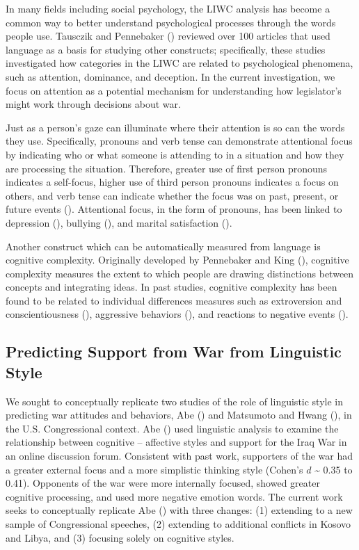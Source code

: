 \documentclass[jou,a4paper]{apa6}
\begin{document}
In many fields including social psychology, the LIWC analysis has become a common way to better understand psychological processes through the words people use. Tausczik and Pennebaker (\citeyear{Tausczik2012}) reviewed over 100 articles that used language as a basis for studying other constructs; specifically, these studies investigated how categories in the LIWC are related to psychological phenomena, such as attention, dominance, and deception. In the current investigation, we focus on attention as a potential mechanism for understanding how legislator's might work through decisions about war.

Just as a person's gaze can illuminate where their attention is so can the words they use. Specifically, pronouns and verb tense can demonstrate attentional focus by indicating who or what someone is attending to in a situation and how they are processing the situation. Therefore, greater use of first person pronouns indicates a self-focus, higher use of third person pronouns indicates a focus on others, and verb tense can indicate whether the focus was on past, present, or future events (\cite{Tausczik2010}). Attentional focus, in the form of pronouns, has been linked to depression (\cite{Rude2004}), bullying (\cite{Kowalski2000}), and marital satisfaction (\cite{Simmons2005}).

Another construct which can be automatically measured from language is cognitive complexity. Originally developed by Pennebaker and King (\citeyear{Pennebaker1999}), cognitive complexity measures the extent to which people are drawing distinctions between concepts and integrating ideas. In past studies, cognitive complexity has been found to be related to individual differences measures such as extroversion and conscientiousness (\cite{Pennebaker1999}), aggressive behaviors (\cite{Pennebaker2011}), and reactions to negative events (\cite{Abe2011}).

\subsection{Predicting Support from War from Linguistic Style}

We sought to conceptually replicate two studies of the role of linguistic style in predicting war attitudes and behaviors, Abe (\citeyear{Abe2012}) and Matsumoto and Hwang (\citeyear{Matsumoto2013}), in the U.S. Congressional context. Abe (\citeyear{Abe2012}) used linguistic analysis to examine the relationship between cognitive -- affective styles and support for the Iraq War in an online discussion forum. Consistent with past work, supporters of the war had a greater external focus and a more simplistic thinking style (Cohen's \(d\) \textasciitilde{} 0.35 to 0.41). Opponents of the war were more internally focused, showed greater cognitive processing, and used more negative emotion words. The current work seeks to conceptually replicate Abe (\citeyear{Abe2012}) with three changes: (1) extending to a new sample of Congressional speeches, (2) extending to additional conflicts in Kosovo and Libya, and (3) focusing solely on cognitive styles.
\end{document}

